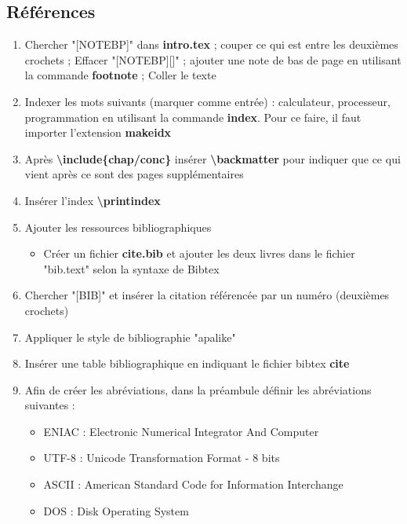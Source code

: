 \documentclass[11pt, a4paper]{article}
\begin{document}
\subsection*{Références}

\begin{enumerate}
	\item Chercher "[NOTEBP]" dans \textbf{intro.tex} ; couper ce qui est entre les deuxièmes crochets ; Effacer "[NOTEBP][]" ; ajouter une note de bas de page en utilisant la commande \textbf{footnote} ; Coller le texte 
	
	\item Indexer les mots suivants (marquer comme entrée) : calculateur, processeur, programmation en utilisant la commande \textbf{index}. Pour ce faire, il faut importer l'extension \textbf{makeidx}
	\item Après \textbf{\textbackslash include\{chap/conc\}} insérer \textbf{\textbackslash backmatter} pour indiquer que ce qui vient après ce sont des pages supplémentaires
	\item Insérer l'index \textbf{\textbackslash printindex}
	\item Ajouter les ressources bibliographiques 
	\begin{itemize}
		\item Créer un fichier \textbf{cite.bib} et ajouter les deux livres dans le fichier "bib.text" selon la syntaxe de Bibtex
	\end{itemize}
	\item Chercher "[BIB]" et insérer la citation référencée par un numéro (deuxièmes crochets)
	\item Appliquer le style de bibliographie "apalike"
	\item Insérer une table bibliographique en indiquant le fichier bibtex \textbf{cite}
	
	\item Afin de créer les abréviations, dans la préambule définir les abréviations suivantes : 
	\begin{multicols}{2}
		\begin{itemize}
			\item ENIAC : Electronic Numerical Integrator And Computer
			\item UTF-8 : Unicode Transformation Format - 8 bits
			\item ASCII : American Standard Code for Information Interchange
			\item DOS : Disk Operating System
		\end{itemize}
	\end{multicols}
	

\end{enumerate}
\end{document}
